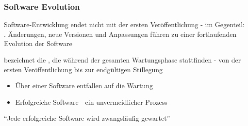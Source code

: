 \subsubsection*{Software Evolution}
\begin{infoBox}
    Software-Entwicklung endet nicht mit der ersten Veröffentlichung - im Gegenteil: . Änderungen, neue Versionen und Anpassungen führen zu einer fortlaufenden Evolution der Software
\end{infoBox}
\begin{infoBox}[title=Definition: Software-Evolution]
     bezeichnet die , die während der gesamten Wartungsphase stattfinden - von der ersten Veröffentlichung bis zur endgültigen Stillegung\\
    \begin{itemize}
        \item Über  einer Software entfallen auf die Wartung
        \item Erfolgreiche Software  - ein unvermeidlicher Prozess
    \end{itemize}
     \enquote{Jede erfolgreiche Software wird zwangsläufig gewartet}
\end{infoBox}
